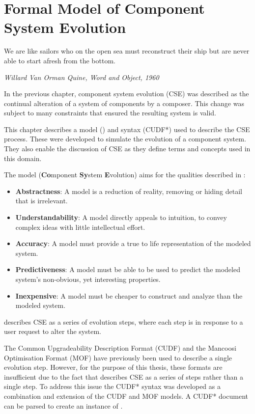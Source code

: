\chapter{Formal Model of Component System Evolution}
\label{formal}
\epigraph{We are like sailors who on the open sea must reconstruct their ship but are never able to start afresh from the bottom.}
{\textit{Willard Van Orman Quine, Word and Object, 1960}}
In the previous chapter, component system evolution (CSE) was described as the continual alteration of a system of components by a composer.
This change was subject to many constraints that ensured the resulting system is valid.

This chapter describes a model (\modelname) and syntax (CUDF*) used to describe the CSE process. 
These were developed to simulate the evolution of a component system.
They also enable the discussion of CSE as they define terms and concepts used in this domain.

The model \modelname (\textbf{Co}mponent \textbf{Sy}stem \textbf{E}volution) aims for the qualities described in \citep{Selic2003}:
\begin{itemize}
  \item \textbf{Abstractness}: A model is a reduction of reality, removing or hiding detail that is irrelevant.
  \item \textbf{Understandability}: A model directly appeals to intuition, to convey complex ideas with little intellectual effort.
  \item \textbf{Accuracy}: A model must provide a true to life representation of the modeled system.
  \item \textbf{Predictiveness}: A model must be able to be used to predict the modeled system's non-obvious, yet interesting properties.
  \item \textbf{Inexpensive}: A model must be cheaper to construct and analyze than the modeled system.
\end{itemize}
\modelname describes CSE as a series of evolution steps, where each step is in response to a user request to alter the system. 

The Common Upgradeability Description Format (CUDF) \citep{treinen2009common} 
and the Mancoosi Optimisation Format (MOF) \citep{abate2011} have previously been used to describe a single evolution step.
However, for the purpose of this thesis, these formats are insufficient due to the fact that \modelname describes CSE as a series of steps rather than a single step.
To address this issue the CUDF* syntax was developed as a combination and extension of the CUDF and MOF models.
A CUDF* document can be parsed to create an instance of \modelname.

